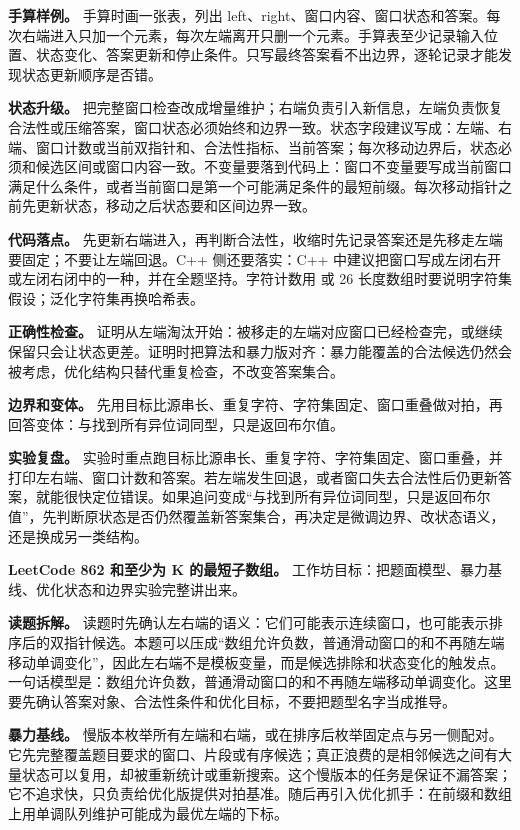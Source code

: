 \textbf{手算样例。} 手算时画一张表，列出 left、right、窗口内容、窗口状态和答案。每次右端进入只加一个元素，每次左端离开只删一个元素。手算表至少记录输入位置、状态变化、答案更新和停止条件。只写最终答案看不出边界，逐轮记录才能发现状态更新顺序是否错。

\textbf{状态升级。} 把完整窗口检查改成增量维护；右端负责引入新信息，左端负责恢复合法性或压缩答案，窗口状态必须始终和边界一致。状态字段建议写成：左端、右端、窗口计数或当前双指针和、合法性指标、当前答案；每次移动边界后，状态必须和候选区间或窗口内容一致。不变量要落到代码上：窗口不变量要写成当前窗口满足什么条件，或者当前窗口是第一个可能满足条件的最短前缀。每次移动指针之前先更新状态，移动之后状态要和区间边界一致。

\textbf{代码落点。} 先更新右端进入，再判断合法性，收缩时先记录答案还是先移走左端要固定；不要让左端回退。C++ 侧还要落实：C++ 中建议把窗口写成左闭右开或左闭右闭中的一种，并在全题坚持。字符计数用  或 26 长度数组时要说明字符集假设；泛化字符集再换哈希表。

\textbf{正确性检查。} 证明从左端淘汰开始：被移走的左端对应窗口已经检查完，或继续保留只会让状态更差。证明时把算法和暴力版对齐：暴力能覆盖的合法候选仍然会被考虑，优化结构只替代重复检查，不改变答案集合。

\textbf{边界和变体。} 先用目标比源串长、重复字符、字符集固定、窗口重叠做对拍，再回答变体：与找到所有异位词同型，只是返回布尔值。

\textbf{实验复盘。} 实验时重点跑目标比源串长、重复字符、字符集固定、窗口重叠，并打印左右端、窗口计数和答案。若左端发生回退，或者窗口失去合法性后仍更新答案，就能很快定位错误。如果追问变成“与找到所有异位词同型，只是返回布尔值”，先判断原状态是否仍然覆盖新答案集合，再决定是微调边界、改状态语义，还是换成另一类结构。

\noindent\textbf{LeetCode 862 和至少为 K 的最短子数组。} 工作坊目标：把题面模型、暴力基线、优化状态和边界实验完整讲出来。

\textbf{读题拆解。} 读题时先确认左右端的语义：它们可能表示连续窗口，也可能表示排序后的双指针候选。本题可以压成“数组允许负数，普通滑动窗口的和不再随左端移动单调变化”，因此左右端不是模板变量，而是候选排除和状态变化的触发点。一句话模型是：数组允许负数，普通滑动窗口的和不再随左端移动单调变化。这里要先确认答案对象、合法性条件和优化目标，不要把题型名字当成推导。

\textbf{暴力基线。} 慢版本枚举所有左端和右端，或在排序后枚举固定点与另一侧配对。它先完整覆盖题目要求的窗口、片段或有序候选；真正浪费的是相邻候选之间有大量状态可以复用，却被重新统计或重新搜索。这个慢版本的任务是保证不漏答案；它不追求快，只负责给优化版提供对拍基准。随后再引入优化抓手：在前缀和数组上用单调队列维护可能成为最优左端的下标。

